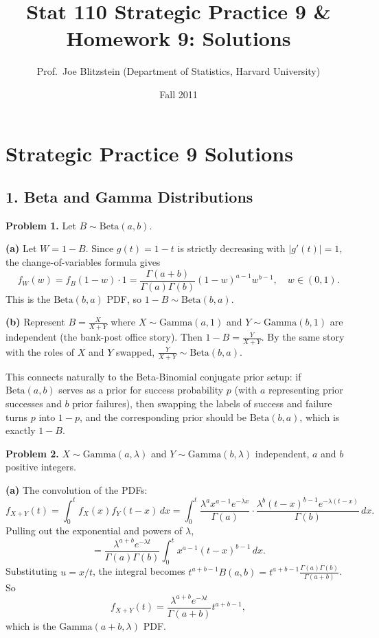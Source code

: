 \documentclass{article}
\title{Stat 110 Strategic Practice 9 \& Homework 9: Solutions}
\author{Prof.\ Joe Blitzstein (Department of Statistics, Harvard University)}
\date{Fall 2011}
\begin{document}
\maketitle

\section*{Strategic Practice 9 Solutions}

\subsection*{1. Beta and Gamma Distributions}

\textbf{Problem 1.} Let $B\sim\text{Beta}(a,b)$.

\textbf{(a)} Let $W=1-B$. Since $g(t)=1-t$ is strictly decreasing with $|g'(t)|=1$, the change-of-variables formula gives
$$
f_W(w) = f_B(1-w)\cdot 1 = \frac{\Gamma(a+b)}{\Gamma(a)\Gamma(b)}(1-w)^{a-1}w^{b-1}, \quad w\in(0,1).
$$
This is the $\text{Beta}(b,a)$ PDF, so $1-B\sim\text{Beta}(b,a)$.

\textbf{(b)} Represent $B=\frac{X}{X+Y}$ where $X\sim\text{Gamma}(a,1)$ and $Y\sim\text{Gamma}(b,1)$ are independent (the bank-post office story). Then $1-B=\frac{Y}{X+Y}$. By the same story with the roles of $X$ and $Y$ swapped, $\frac{Y}{X+Y}\sim\text{Beta}(b,a)$.

This connects naturally to the Beta-Binomial conjugate prior setup: if $\text{Beta}(a,b)$ serves as a prior for success probability $p$ (with $a$ representing prior successes and $b$ prior failures), then swapping the labels of success and failure turns $p$ into $1-p$, and the corresponding prior should be $\text{Beta}(b,a)$, which is exactly $1-B$.

\bigskip
\textbf{Problem 2.} $X\sim\text{Gamma}(a,\lambda)$ and $Y\sim\text{Gamma}(b,\lambda)$ independent, $a$ and $b$ positive integers.

\textbf{(a)} The convolution of the PDFs:
$$
f_{X+Y}(t) = \int_0^t f_X(x)f_Y(t-x)\,dx = \int_0^t \frac{\lambda^a x^{a-1}e^{-\lambda x}}{\Gamma(a)}\cdot\frac{\lambda^b(t-x)^{b-1}e^{-\lambda(t-x)}}{\Gamma(b)}\,dx.
$$
Pulling out the exponential and powers of $\lambda$,
$$
= \frac{\lambda^{a+b}e^{-\lambda t}}{\Gamma(a)\Gamma(b)}\int_0^t x^{a-1}(t-x)^{b-1}\,dx.
$$
Substituting $u=x/t$, the integral becomes $t^{a+b-1}B(a,b)=t^{a+b-1}\frac{\Gamma(a)\Gamma(b)}{\Gamma(a+b)}$. So
$$
f_{X+Y}(t) = \frac{\lambda^{a+b}e^{-\lambda t}}{\Gamma(a+b)}t^{a+b-1},
$$
which is the $\text{Gamma}(a+b,\lambda)$ PDF.
\end{document}
